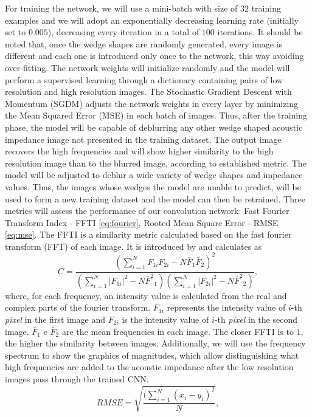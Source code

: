 \documentclass[conference]{IEEEtran}
\begin{document}
For training the network, we will use a mini-batch with size of $32$ training examples
and we will adopt an exponentially decreasing learning rate (initially
set to $0.005$), decreasing every iteration in a total of $100$ iterations.
It should be noted that, once the wedge shapes are randomly generated, every image is different
and each one is introduced only once to the network, this way avoiding over-fitting.
The network weights will initialize randomly and the model will perform a supervised learning through a dictionary containing pairs of low resolution and high resolution images.
The Stochastic Gradient Descent with Momentum (SGDM) \cite{Ning1999} adjusts the network weights in every layer by minimizing the Mean Squared Error (MSE)
in each batch of images. Thus, after the training phase, the model will be capable of
deblurring any other wedge shaped acoustic impedance image not presented in the training dataset. The output
image recovers the high frequencies and will show higher similarity
to the high resolution image than to the blurred image, according to established metric.
The model will be adjusted to deblur a wide variety of wedge shapes and impedance values.
Thus, the images whose wedges the model are unable to predict, will be used to form a new training dataset
and the model can then be retrained.
Three metrics will assess the performance of our convolution network: Fast Fourier Transform Index - FFTI \eqref{eq:fourier},
Rooted Mean Square Error - RMSE \eqref{eq:mse}. 
The FFTI is a similarity metric calculated based on the fast fourier transform (FFT) of each image.
It is introduced by \cite{Naranyana2015} and calculates as 
\begin{equation}
 C = \frac{ (\sum_{i=1}^{N}{F_{1i}F_{2i}} - N \bar{F}_1\bar{F}_2 )^2 }{ (\sum_{i=1}^{N}{|F_{1i}|^2} - N{\bar{F}^2}_1)( \sum_{i=1}^{N}{|F_{2i}|^2} - N{\bar{F}^2}_2 )},
 \label{eq:fourier}
\end{equation}
where, for each frequency, an intensity value is calculated from the real and complex parts of the fourier
transform. $F_{1i}$ represents the intensity value of $i$-th \textit{pixel} in the first image and $F_{2i}$
is the intensity value of $i$-th \textit{pixel} in the second image. $\bar{F}_1$ e $\bar{F}_2$ are the mean
frequencies in each image. The closer FFTI is to $1$, the higher the similarity between images.
Additionally, we will use the frequency spectrum to show the graphics of magnitudes, which allow distinguishing what high frequencies are added to the acoustic impedance after the low resolution images pass through the trained CNN. 
\begin{equation}
 RMSE = \sqrt{\frac{ (\sum_{i=1}^{N}{(x_i -y_i)^2 } }{N}},
 \label{eq:mse}
\end{equation}
\end{document}
